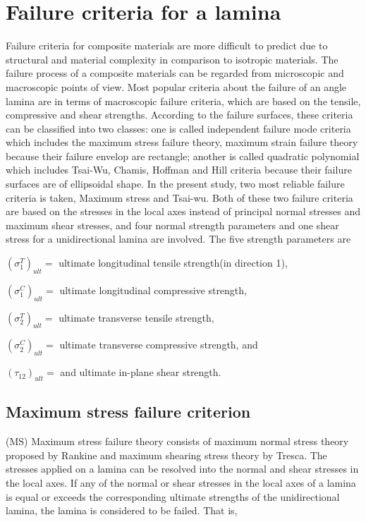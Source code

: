 \section{Failure criteria for a lamina}

Failure criteria for composite materials are more difficult to predict due to
structural and material complexity in comparison to isotropic materials. The
failure process of a composite materials can be regarded from microscopic and
macroscopic points of view. Most popular criteria about the failure of an angle
lamina are in terms of macroscopic failure criteria, which are based on the
tensile, compressive and shear strengths. According to the failure surfaces,
these criteria can be classified into two classes: one is called independent
failure mode criteria which includes the maximum stress failure theory, maximum
strain failure theory because their failure envelop are rectangle; another is
called quadratic polynomial which includes Tsai-Wu, Chamis, Hoffman and Hill
criteria because their failure surfaces are of ellipsoidal shape. In the present
study, two most reliable failure criteria is taken, Maximum stress and Tsai-wu.
Both of these two failure criteria are based on the stresses in the local axes
instead of principal normal stresses and maximum shear stresses, and four normal
strength parameters and one shear stress for a unidirectional lamina are
involved. The five strength parameters are

$(\sigma _1^{T})_{ult}= $ ultimate longitudinal tensile strength(in direction 1),

$(\sigma _1^{C})_{ult}= $ ultimate longitudinal compressive strength,

$(\sigma _2^{T})_{ult}= $ ultimate transverse tensile strength,

$(\sigma _2^{C})_{ult}= $ ultimate transverse compressive strength, and

$(\tau_{12})_{ult}= $ and ultimate in-plane shear strength.

\subsection{Maximum stress failure criterion}(MS)
Maximum stress failure theory consists of maximum normal stress theory proposed by Rankine and maximum 
shearing stress theory by Tresca. The stresses applied on a lamina can be resolved into the normal and shear stresses 
in the local axes. If any of the normal or shear stresses in the local axes of a lamina is equal or exceeds the corresponding 
ultimate strengths of the unidirectional lamina, the lamina is considered to be failed. That is,

